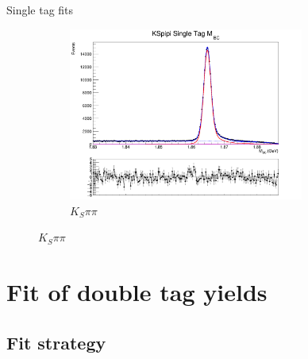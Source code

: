 \documentclass{beamer}
\begin{document}
\begin{frame}{Single tag fits}
\begin{figure}
\begin{subfigure}{0.5\textwidth}
      \includegraphics[width=0.85\textwidth]{Plots/KSpipi_SingleTag_MBC_Plot.png}
      \caption{$K_S\pi\pi$}
    \end{subfigure}
  \end{figure}
\end{frame}

\section{Fit of double tag yields}
\subsection{Fit strategy}
\end{document}
